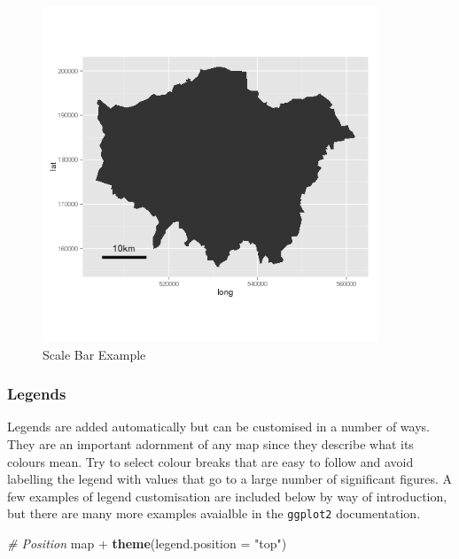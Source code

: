 \documentclass[]{article}
\newenvironment{Shaded}{}{}
\newcommand{\KeywordTok}[1]{\textcolor[rgb]{0.00,0.44,0.13}{\textbf{{#1}}}}
\newcommand{\DataTypeTok}[1]{\textcolor[rgb]{0.56,0.13,0.00}{{#1}}}
\newcommand{\StringTok}[1]{\textcolor[rgb]{0.25,0.44,0.63}{{#1}}}
\newcommand{\CommentTok}[1]{\textcolor[rgb]{0.38,0.63,0.69}{\textit{{#1}}}}
\newcommand{\NormalTok}[1]{{#1}}
\let\Oldincludegraphics\includegraphics
\renewcommand{\includegraphics}[1]{\Oldincludegraphics[width=10cm]{#1}}
\begin{document}
\begin{figure}[htbp]
\centering
\includegraphics{figure/Scale_Bar_Example.png}
\caption{Scale Bar Example}
\end{figure}

\subsubsection{Legends}

Legends are added automatically but can be customised in a number of
ways. They are an important adornment of any map since they describe
what its colours mean. Try to select colour breaks that are easy to
follow and avoid labelling the legend with values that go to a large
number of significant figures. A few examples of legend customisation
are included below by way of introduction, but there are many more
examples avaialble in the \texttt{ggplot2} documentation.

\begin{Shaded}
\begin{Highlighting}[]
\CommentTok{# Position}
\NormalTok{map + }\KeywordTok{theme}\NormalTok{(}\DataTypeTok{legend.position =} \StringTok{"top"}\NormalTok{)}
\end{Highlighting}
\end{Shaded}
\end{document}
